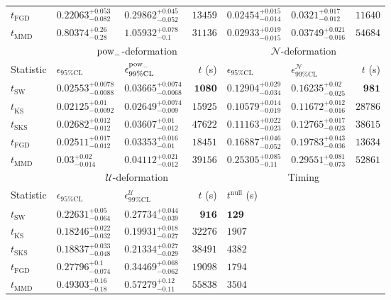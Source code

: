 \begin{tabular}{l|llr|llr}
	$t_{\mathrm{FGD}}$ & ${\mathbf{0.22063_{-0.082}^{+0.053}}}$ & ${\mathbf{0.29862_{-0.052}^{+0.045}}}$ & $13459$ & $0.02454_{-0.014}^{+0.015}$ & $0.0321_{-0.012}^{+0.017}$ & $11640$ \\
	$t_{\mathrm{MMD}}$ & $0.80374_{-0.28}^{+0.26}$ & $1.05932_{-0.1}^{+0.078}$ & $31136$ & $0.02933_{-0.015}^{+0.019}$ & $0.03749_{-0.016}^{+0.021}$ & $54684$ \\
	\toprule
	\multicolumn{1}{c}{} & \multicolumn{3}{c}{$\rm{pow}_{-}$-deformation} & \multicolumn{3}{c}{$\mathcal{N}$-deformation} \\
	Statistic & $\epsilon_{95\%\mathrm{CL}}$ & $\epsilon^  {\rm{pow}_{-}}_{99\%\mathrm{CL}}$ & $t$ (s) & $\epsilon_{95\%\mathrm{CL}}$ & $\epsilon^    {\mathcal{N}}_{99\%\mathrm{CL}}$ & $t$ (s) \\
	\midrule
	$t_{\mathrm{SW}}$ & $0.02553_{-0.0088}^{+0.0078}$ & $0.03665_{-0.0068}^{+0.0074}$ & ${\mathbf{1080}}$ & $0.12904_{-0.034}^{+0.029}$ & $0.16235_{-0.025}^{+0.02}$ & ${\mathbf{981}}$ \\
	$t_{\overline{\mathrm{KS}}}$ & ${\mathbf{0.02125_{-0.0092}^{+0.01}}}$ & ${\mathbf{0.02649_{-0.009}^{+0.0074}}}$ & $15925$ & ${\mathbf{0.10579_{-0.019}^{+0.014}}}$ & ${\mathbf{0.11672_{-0.016}^{+0.012}}}$ & $28786$ \\
	$t_{\mathrm{SKS}}$ & $0.02682_{-0.012}^{+0.012}$ & $0.03607_{-0.012}^{+0.01}$ & $47622$ & $0.11163_{-0.023}^{+0.022}$ & $0.12765_{-0.023}^{+0.017}$ & $38615$ \\
	$t_{\mathrm{FGD}}$ & $0.02511_{-0.012}^{+0.017}$ & $0.03353_{-0.01}^{+0.016}$ & $18451$ & $0.16887_{-0.052}^{+0.046}$ & $0.19783_{-0.036}^{+0.043}$ & $13634$ \\
	$t_{\mathrm{MMD}}$ & $0.03_{-0.014}^{+0.02}$ & $0.04112_{-0.012}^{+0.021}$ & $39156$ & $0.25305_{-0.11}^{+0.085}$ & $0.29551_{-0.073}^{+0.081}$ & $52861$ \\
	\toprule
	\multicolumn{1}{c}{} & \multicolumn{3}{c}{$\mathcal{U}$-deformation} & \multicolumn{3}{c}{Timing} \\
	Statistic & $\epsilon_{95\%\mathrm{CL}}$ & $\epsilon^    {\mathcal{U}}_{99\%\mathrm{CL}}$ & $t$ (s) & $t^{\mathrm{null}}$ (s) \\
	\midrule
	$t_{\mathrm{SW}}$ & $0.22631_{-0.064}^{+0.05}$ & $0.27734_{-0.039}^{+0.044}$ & ${\mathbf{916}}$ & ${\mathbf{129}}$ \\
	$t_{\overline{\mathrm{KS}}}$ & ${\mathbf{0.18246_{-0.032}^{+0.022}}}$ & ${\mathbf{0.19931_{-0.027}^{+0.018}}}$ & $32276$ & $1907$ \\
	$t_{\mathrm{SKS}}$ & $0.18837_{-0.048}^{+0.033}$ & $0.21334_{-0.029}^{+0.027}$ & $38491$ & $4382$ \\
	$t_{\mathrm{FGD}}$ & $0.27796_{-0.074}^{+0.1}$ & $0.34469_{-0.062}^{+0.068}$ & $19098$ & $1794$ \\
	$t_{\mathrm{MMD}}$ & $0.49303_{-0.18}^{+0.16}$ & $0.57279_{-0.11}^{+0.12}$ & $55838$ & $3504$ \\
	\bottomrule
\end{tabular}